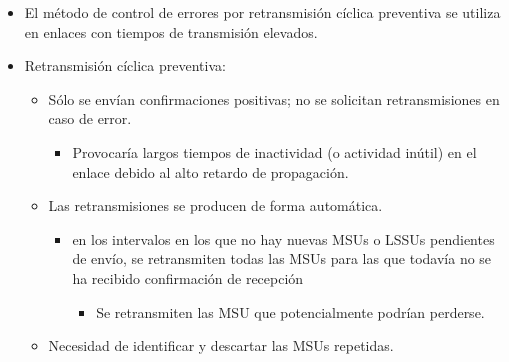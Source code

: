 \documentclass[10pt,portrait, twocolumn]{article}
\begin{document}
	\begin{itemize}
	\item El método de control de errores por retransmisión cíclica preventiva se utiliza en enlaces con tiempos de transmisión elevados.
	\item Retransmisión cíclica preventiva:
		\begin{itemize}
		\item Sólo se envían confirmaciones positivas; no se solicitan retransmisiones en caso de error.
			\begin{itemize}
			\item Provocaría largos tiempos de inactividad (o actividad inútil) en el enlace debido al alto retardo de propagación.
			\end{itemize}
		\item Las retransmisiones se producen de forma automática.
			\begin{itemize}
			\item en los intervalos en los que no hay nuevas MSUs o LSSUs pendientes de envío, se retransmiten todas las MSUs para las que todavía no se ha recibido confirmación de recepción
				\begin{itemize}
				\item Se retransmiten las MSU que potencialmente podrían perderse.
				\end{itemize}
			\end{itemize}
		\item Necesidad de identificar y descartar las MSUs repetidas.
		\end{itemize}
	\end{itemize}
	
\end{document}

